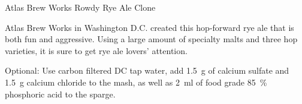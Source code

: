 \stylesection{\styleamericanwheatorrye}

\begin{recipie}{Atlas Brew Works Rowdy Rye Ale Clone}

\begin{aboutblock}
Atlas Brew Works in Washington D.C. created this hop-forward rye ale that is both
fun and aggressive. Using a large amount of specialty malts and three hop varieties,
it is sure to get rye ale lovers' attention. \sourceaha
\end{aboutblock}


\begin{methodandtiming}
 
\begin{mashsteps}
\end{mashsteps}

\begin{directions}
Optional: Use carbon filtered DC tap water, add 1.5~g of calcium sulfate and
1.5~g calcium chloride to the mash, as well as 2~ml of food grade 85~\%
phosphoric acid to the sparge.
\end{directions}

\end{methodandtiming}

\pagebreak

\begin{ingredientsblock}

\begin{malts}
\end{malts}

\begin{hops}
\end{hops}


\end{ingredientsblock}

\end{recipie}

